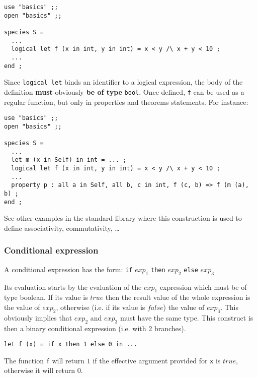 {\scriptsize
\begin{lstlisting}
use "basics" ;;
open "basics" ;;

species S =
  ...
  logical let f (x in int, y in int) = x < y /\ x + y < 10 ;
  ...
end ;
\end{lstlisting}}

Since {\tt logical let} binds an identifier to a logical expression, the
body of the definition {\bf must} obviously {\bf be of type}
{\tt bool}. Once defined, {\tt f} can be used as a regular function,
but only in
properties and theorems statements. For instance:

{\scriptsize
\begin{lstlisting}
use "basics" ;;
open "basics" ;;

species S =
  ...
  let m (x in Self) in int = ... ;
  logical let f (x in int, y in int) = x < y /\ x + y < 10 ;
  ...
  property p : all a in Self, all b, c in int, f (c, b) => f (m (a), b) ;
end ;
\end{lstlisting}}

See other examples in the standard library where this construction is
used to define associativity, commutativity, \ldots




\subsubsection{Conditional expression}
\label{conditional-expression}
A conditional expression has the form:
{\tt if} $exp_1$ {\tt then}
$exp_2$ {\tt else} $exp_3$

Its evaluation starts by the evaluation of the $exp_1$ expression
which must be of type boolean. If its value is $true$ then the result
value of the whole expression is the value of $exp_2$, otherwise
(i.e. if its value is $false$) the value of $exp_3$. This obviously
implies that $exp_2$ and $exp_3$ must have the same type. This
construct is then a binary conditional expression (i.e. with 2
branches).

 {\scriptsize
\begin{lstlisting}
let f (x) = if x then 1 else 0 in ...
\end{lstlisting}}

The function {\tt f} will return $1$ if the effective argument
provided for {\tt x} is $true$, otherwise it will return $0$.

